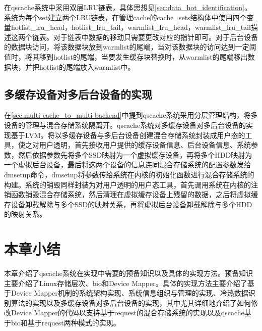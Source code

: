 在qscache系统中采用双层LRU链表，具体思想见\ref{sec:data_hot_identification}。系统为每个set建立两个LRU链表，在管理cache的cache\_sets结构体中使用四个变量hotlist\_lru\_head，hotlist\_lru\_tail，warmlist\_lru\_head，warmlist\_lru\_tail描述这两个链表。对于链表中数据的移动只需要更改对应的指针即可。对于后台设备的数据块访问，将该数据块放到warmlist的尾端，当对该数据块的访问达到一定阈值时，将其移到hotlist的尾端，当要发生缓存块替换时，从warmlist的尾端移出数据块，并把hotlist的尾端放入warmlist中。

\subsection{多缓存设备对多后台设备的实现}

在\ref{sec:multi-cache_to_multi-backend}中提到qscache系统采用分层管理结构，将多设备的管理与混合存储系统隔离开。qscache系统对多缓存设备对多后台设备的实现基于LVM。将以多缓存设备与多后台设备创建混合存储系统封装成用户态的工具，使之对用户透明，首先接收用户提供的缓存设备信息、后台设备信息、系统参数，然后依据参数先将多个SSD映射为一个虚拟缓存设备，再将多个HDD映射为一个虚拟后台设备，最后将这两个设备的信息连同混合存储系统的配置参数发给dmsetup命令，dmsetup将参数传给系统在内核的初始化函数进行混合存储系统的构建。系统的销毁同样封装为对用户透明的用户态工具，首先调用系统在内核的注销函数销毁混合存储系统，然后清理在虚拟缓存设备上残留的数据，之后将虚拟缓存设备卸载解除与多个SSD的映射关系，再将虚拟后台设备卸载解除与多个HDD的映射关系。


\section{本章小结}
本章介绍了qscache系统在实现中需要的预备知识以及具体的实现方法。预备知识主要介绍了Linux存储层次、bio和Device Mapper。具体的实现方法主要介绍了基于Device Mapper机制的系统架构实现、系统信息组织与管理的实现、冷热数据识别算法的实现以及多缓存设备对多后台设备的实现，其中尤其详细地介绍了如何修改Device Mapper的代码以支持基于request的混合存储系统的实现以及qscache基于bio和基于request两种模式的实现。
